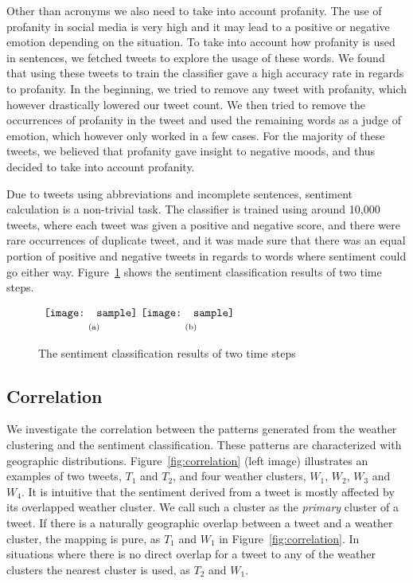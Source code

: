 Other than acronyms we also need to take into account profanity. The use of profanity in social media is very high and it may lead to a positive or negative emotion depending on the situation. To take into account how profanity is used in sentences, we fetched tweets to explore the usage of these words. We found that using these tweets to train the classifier gave a high accuracy rate in regards to profanity. In the beginning, we tried to remove any tweet with profanity, which however drastically lowered our tweet count. We then tried to remove the occurrences of profanity in the tweet and used the remaining words as a judge of emotion, which however only worked in a few cases. For the majority of these tweets, we believed that profanity gave insight to negative moods, and thus decided to take into account profanity.

Due to tweets using abbreviations and incomplete sentences, sentiment calculation is a non-trivial task. The classifier is trained using around 10,000 tweets, where each tweet was given a positive and negative score, and there were rare occurrences of duplicate tweet, and it was made sure that there was an equal portion of positive and negative tweets in regards to words where sentiment could go either way. Figure~\ref{fig:sentiment} shows the sentiment classification results of two time steps.

\begin{figure}[t]
\begin{center}
$\begin{array}{c@{\hspace{0.01\linewidth}}c}
\texttt{[image: sample]} &
\texttt{[image: sample]}
\\
\mbox{\small{(a)}} & \mbox{\small{(b)}}
\end{array}$
\end{center}
\vspace{-.1in}
\caption{The sentiment classification results of two time steps }
\label{fig:sentiment}
\end{figure}


\subsection{Correlation}
\label{sec:corr}

We investigate the correlation between the patterns generated from the weather clustering and the sentiment classification. These patterns are characterized with geographic distributions. Figure~\ref{fig:correlation} (left image) illustrates an examples of two tweets, $T_1$ and $T_2$, and four weather clusters, $W_1$, $W_2$, $W_3$ and $W_4$. It is intuitive that the sentiment derived from a tweet is mostly affected by its overlapped weather cluster. We call such a cluster as the \emph{primary} cluster of a tweet. If there is a naturally geographic overlap between a tweet and a weather cluster, the mapping is pure, as $T_1$ and $W_1$ in Figure~\ref{fig:correlation}. In situations where there is no direct overlap for a tweet to any of the weather clusters the nearest cluster is used, as $T_2$ and $W_1$.

